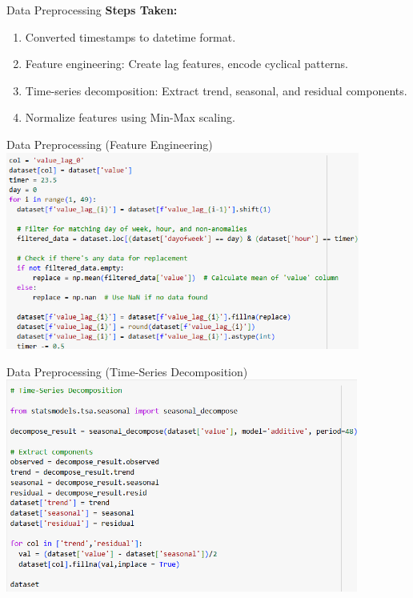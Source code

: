 \documentclass[10pt]{beamer}
\begin{document}
\begin{frame}{Data Preprocessing}
    \textbf{Steps Taken:}
    \begin{enumerate}
        \item Converted timestamps to datetime format.
        \item Feature engineering: Create lag features, encode cyclical patterns.
        \item Time-series decomposition: Extract trend, seasonal, and residual components.
        \item Normalize features using Min-Max scaling.
    \end{enumerate}
\end{frame}

\begin{frame}{Data Preprocessing (Feature Engineering)}
    \centering
    \includegraphics[height=6.5cm]{Feature Engineering.png}
\end{frame}

\begin{frame}{Data Preprocessing (Time-Series Decomposition)}
    \centering
    \includegraphics[height=7cm]{Time-Series Decomposition.png}
\end{frame}
\end{document}
